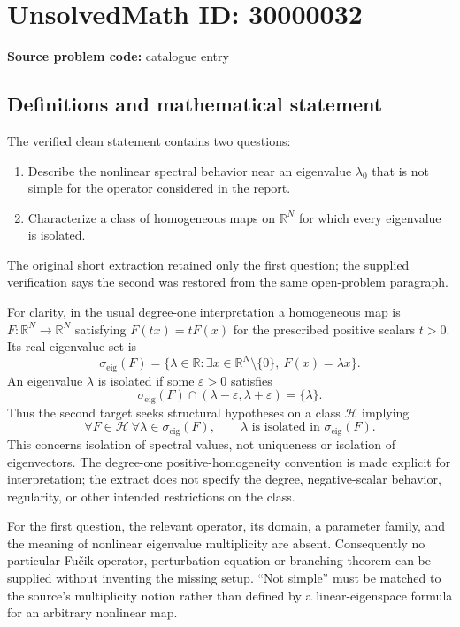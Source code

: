 \documentclass[11pt]{article}
\newcommand{\R}{\mathbb{R}}
\begin{document}
\section*{UnsolvedMath ID: 30000032}
\textbf{Source problem code:} catalogue entry
\subsection{Definitions and mathematical statement}
The verified clean statement contains two questions:
\begin{enumerate}
\item Describe the nonlinear spectral behavior near an eigenvalue $\lambda_0$ that is not simple for the operator considered in the report.
\item Characterize a class of homogeneous maps on $\R^N$ for which every eigenvalue is isolated.
\end{enumerate}
The original short extraction retained only the first question; the supplied verification says the second was restored from the same open-problem paragraph.

For clarity, in the usual degree-one interpretation a homogeneous map is $F:\R^N\to\R^N$ satisfying $F(tx)=tF(x)$ for the prescribed positive scalars $t>0$. Its real eigenvalue set is
\[
 \sigma_{\mathrm{eig}}(F)=\{\lambda\in\R:\exists x\in\R^N\setminus\{0\},\ F(x)=\lambda x\}.
\]
An eigenvalue $\lambda$ is isolated if some $\varepsilon>0$ satisfies
\[
 \sigma_{\mathrm{eig}}(F)\cap(\lambda-\varepsilon,\lambda+\varepsilon)=\{\lambda\}.
\]
Thus the second target seeks structural hypotheses on a class $\mathcal H$ implying
\[
 \forall F\in\mathcal H\ \forall\lambda\in\sigma_{\mathrm{eig}}(F),
 \qquad\lambda\text{ is isolated in }\sigma_{\mathrm{eig}}(F).
\]
This concerns isolation of spectral values, not uniqueness or isolation of eigenvectors. The degree-one positive-homogeneity convention is made explicit for interpretation; the extract does not specify the degree, negative-scalar behavior, regularity, or other intended restrictions on the class.

For the first question, the relevant operator, its domain, a parameter family, and the meaning of nonlinear eigenvalue multiplicity are absent. Consequently no particular Fu\v cik operator, perturbation equation or branching theorem can be supplied without inventing the missing setup. ``Not simple'' must be matched to the source's multiplicity notion rather than defined by a linear-eigenspace formula for an arbitrary nonlinear map.
\end{document}
